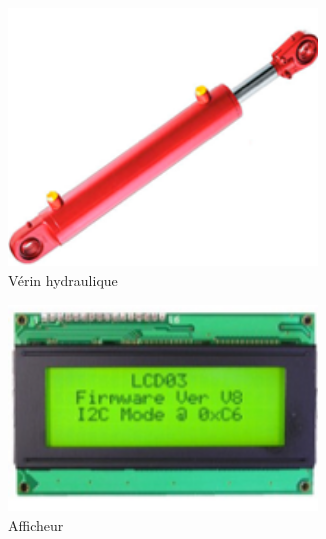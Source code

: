 \documentclass[10pt,fleqn]{article} %
\begin{document}
\begin{figure}[h]
\begin{subfigure}{.25\textwidth}
    \includegraphics[width=0.9\textwidth,height=.1\textheight,keepaspectratio]{images/verin_hydrqu}
    \caption{Vérin hydraulique}
  \end{subfigure}
  \begin{subfigure}{0.25\textwidth}
    \centering
    \includegraphics[width=0.9\textwidth,height=.1\textheight,keepaspectratio]{images/afficheur}
    \caption{Afficheur}
  \end{subfigure}\hfill
  \begin{subfigure}{.24\textwidth}
    \centering

\end{subfigure}
\end{figure}
\end{document}
